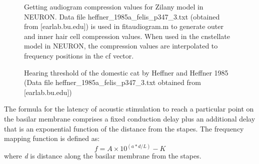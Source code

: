\begin{figure}[htb]
\begin{center}
\caption{Getting audiogram compression values for Zilany model in NEURON\@. Data file \mbox{heffner\_1985a\_felis\_p347\_3.txt} (obtained from [earlab.bu.edu]) is used in \textsf{fitaudiogram.m} to generate outer and inner hair cell compression values. When used in the \textsf{cnstellate} model in NEURON, the compression values are interpolated to frequency positions in the \textsf{cf} vector.}\label{fig:GetAudiogram}
\end{center}
\end{figure}



\medskip{}

\begin{figure}[htb]
\begin{center}
\caption{Hearing threshold of the domestic cat by Heffner and Heffner
  1985 \citep{HeffnerHeffner:1985} (Data file
  \mbox{\textsf{heffner\_1985a\_felis\_p347\_3.txt}} obtained from [earlab.bu.edu])}
\label{fig:AudThresholdRat}
\end{center}
\end{figure}


The formula for the latency of acoustic stimulation to reach a particular point
on the basilar membrane comprises a fixed conduction delay plus an additional
delay that is an exponential function of the distance from the stapes. The
frequency mapping function is defined as:
\begin{equation}
  \label{eq:delay}
 f = A\times10^{\left(a*d/L\right)} - K  
\end{equation}
where \emph{d} is distance along the basilar membrane from the stapes.

